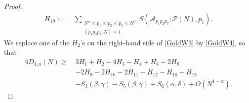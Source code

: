 \documentclass[12pt, a4paper]{amsart}
\def\le{\leqslant}
\def\ge{\geqslant}
\theoremstyle{plain}
\theoremstyle{remark}
\numberwithin{equation}{section}
\begin{document}
\begin{proof}
\begin{equation}
\begin{split}
H_{19}:=\ &\sum_{\substack{N^\alpha \le p_1 \le p_2 \le p_3\le N^\beta \\ (p_1 p_2 p_3, N) = 1}}  S(\mathscr{A}_{p_1 p_2 p_3}; \mathscr{P}(N), p_1). 
\end{split}
\end{equation}
We replace one of the $H_2$'s on the right-hand side of \eqref{GoldW3} by \eqref{GoldW4}, so that 
 \begin{equation}\label{GoldW5}
\begin{split}
4D_{1,a}(N)\ge\ & 3H_1+H_2-4H_3-H_4+H_6-2H_8\\
& -2H_9-2H_{10}-2H_{11} -H_{12} -H_{18}-H_{19} \\ 
& -S_3(\beta,\gamma)-S_5(\beta,\gamma)+S_6(\alpha,\delta)+O(N^{1-\alpha}). 
\end{split}
\end{equation}


\end{proof}
\end{document}
